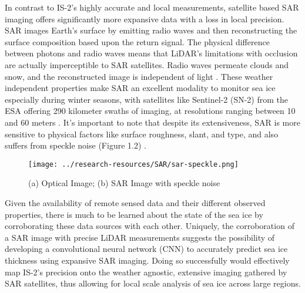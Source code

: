 In contrast to IS-2's highly accurate and local measurements, satellite based SAR imaging offers significantly more expansive data with a loss in local precision. SAR images Earth's surface by emitting radio waves and then reconstructing the surface composition based upon the return signal. The physical difference between photons and radio waves means that LiDAR's limitations with occlusion are actually imperceptible to SAR satellites. Radio waves permeate clouds and snow, and the reconstructed image is independent of light \cite{SAR-Info}. These weather independent properties make SAR an excellent modality to monitor sea ice especially during winter seasons, with satellites like Sentinel-2 (SN-2) from the ESA offering 290 kilometer swaths of imaging, at resolutions ranging between 10 and 60 meters \cite{Sentinel-2-Availability}. It's important to note that despite its extensiveness, SAR is more sensitive to physical factors like surface roughness, slant, and type, and also suffers from speckle noise (Figure 1.2) \cite{SAR-Info}. 

\begin{figure}[h]
	\centering
	\texttt{[image: ../research-resources/SAR/sar-speckle.png]}
	\caption[SAR Speckle Noise]{(a) Optical Image; (b) SAR Image with speckle noise}\cite{SAR-Speckle-Image}
\end{figure}

\indent Given the availability of remote sensed data and their different observed properties, there is much to be learned about the state of the sea ice by corroborating these data sources with each other. Uniquely, the corroboration of a SAR image with precise LiDAR measurements suggests the possibility of developing a convolutional neural network (CNN) to accurately predict sea ice thickness using expansive SAR imaging. Doing so successfully would effectively map IS-2's precision onto the weather agnostic, extensive imaging gathered by SAR satellites, thus allowing for local scale analysis of sea ice across large regions.


